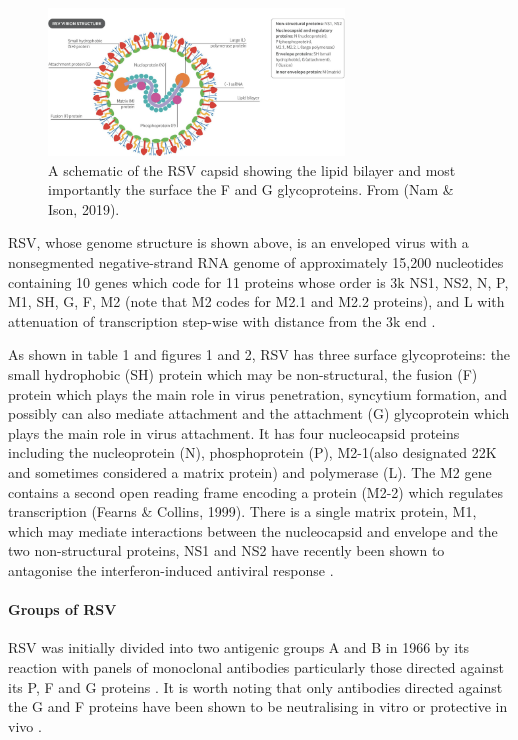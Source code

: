 \documentclass[10pt, a4paper]{article}
\begin{document}
\begin{figure}
\centering
\includegraphics[width=0.7\textwidth]{figures/RSV-cross-section.png}
\caption{\label{fig:orgc7b684e}
A schematic of the RSV capsid showing the lipid bilayer and most importantly the surface the F and G glycoproteins. From (Nam \& Ison, 2019).}
\end{figure}

RSV, whose genome structure is shown above, is an enveloped virus with a
nonsegmented negative-strand RNA genome of approximately 15,200 nucleotides
containing 10 genes which code for 11 proteins whose order is 3k NS1, NS2, N,
P, M1, SH, G, F, M2 (note that M2 codes for M2.1 and M2.2 proteins), and L with
attenuation of transcription step-wise with distance from the 3k end
\cite{caneMolecularEpidemiologyRespiratory2001}.

As shown in table 1 and figures 1 and 2, RSV has three surface glycoproteins:
the small hydrophobic (SH) protein which may be non-structural, the fusion (F)
protein which plays the main role in virus penetration, syncytium formation,
and possibly can also mediate attachment and the attachment (G) glycoprotein
which plays the main role in virus attachment. It has four nucleocapsid
proteins including the nucleoprotein (N), phosphoprotein (P),
M2-1(also designated 22K and sometimes considered a matrix protein) and
polymerase (L). 
The M2 gene contains a second open reading frame encoding a protein (M2-2) which
regulates transcription (Fearns \& Collins, 1999). There is a single matrix 
protein, M1, which may mediate interactions between the nucleocapsid and
envelope and the two non-structural proteins, NS1 and NS2  have recently been 
shown to antagonise the interferon-induced antiviral response
\cite{fearnsRoleM21Transcription1999,schlenderBovineRespiratorySyncytial2000}.
\paragraph{Groups of RSV}
\label{sec:org959c6ad}
RSV was initially divided into two antigenic groups A and B in 1966 by its 
reaction with panels of monoclonal antibodies particularly those directed
against its P, F and G proteins \cite{coatesAntigenicAnalysisRespiratory1966}. 
It is worth noting that only antibodies directed against the G and F proteins
have been shown to be neutralising in vitro or protective in vivo
\cite{caneMolecularEpidemiologyRespiratory2001}. 
\end{document}
